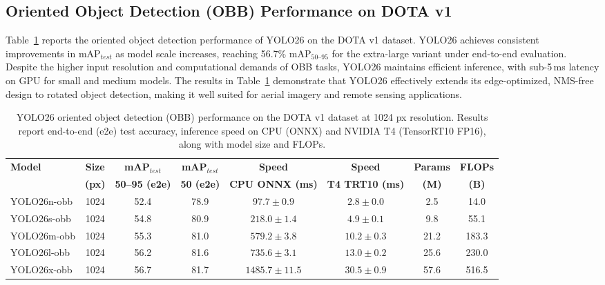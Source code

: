 \documentclass{article}
\begin{document}
\subsection{Oriented Object Detection (OBB) Performance on DOTA v1}

Table~\ref{tab:yolo26_obb} reports the oriented object detection performance of YOLO26 on the DOTA v1 dataset. YOLO26 achieves consistent improvements in mAP$_{test}$ as model scale increases, reaching 56.7\% mAP$_{50\text{--}95}$ for the extra-large variant under end-to-end evaluation. Despite the higher input resolution and computational demands of OBB tasks, YOLO26 maintains efficient inference, with sub-5\,ms latency on GPU for small and medium models. The results in Table~\ref{tab:yolo26_obb} demonstrate that YOLO26 effectively extends its edge-optimized, NMS-free design to rotated object detection, making it well suited for aerial imagery and remote sensing applications.

\begin{table}[h!]
\centering
\scriptsize
\setlength{\tabcolsep}{4pt}
\renewcommand{\arraystretch}{1.15}
\caption{YOLO26 oriented object detection (OBB) performance on the DOTA v1 dataset at 1024 px resolution. Results report end-to-end (e2e) test accuracy, inference speed on CPU (ONNX) and NVIDIA T4 (TensorRT10 FP16), along with model size and FLOPs.}
\label{tab:yolo26_obb}
\vspace{2pt}

\begin{tabular}{l c c c c c c c}
\toprule
\textbf{Model} & \textbf{Size} & \textbf{mAP$_{test}$} & \textbf{mAP$_{test}$} & \textbf{Speed} & \textbf{Speed} & \textbf{Params} & \textbf{FLOPs} \\
 & \textbf{(px)} & \textbf{50--95 (e2e)} & \textbf{50 (e2e)} & \textbf{CPU ONNX (ms)} & \textbf{T4 TRT10 (ms)} & \textbf{(M)} & \textbf{(B)} \\
\midrule
YOLO26n-obb & 1024 & 52.4 & 78.9 & $97.7 \pm 0.9$ & $2.8 \pm 0.0$ & 2.5 & 14.0 \\
YOLO26s-obb & 1024 & 54.8 & 80.9 & $218.0 \pm 1.4$ & $4.9 \pm 0.1$ & 9.8 & 55.1 \\
YOLO26m-obb & 1024 & 55.3 & 81.0 & $579.2 \pm 3.8$ & $10.2 \pm 0.3$ & 21.2 & 183.3 \\
YOLO26l-obb & 1024 & 56.2 & 81.6 & $735.6 \pm 3.1$ & $13.0 \pm 0.2$ & 25.6 & 230.0 \\
YOLO26x-obb & 1024 & 56.7 & 81.7 & $1485.7 \pm 11.5$ & $30.5 \pm 0.9$ & 57.6 & 516.5 \\
\bottomrule
\end{tabular}
\end{table}
\end{document}
